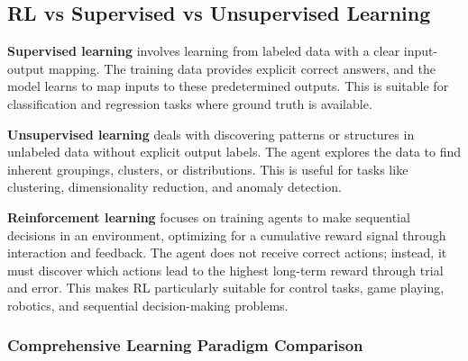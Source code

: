 \documentclass[11pt,a4paper]{article}
\begin{document}
\subsection{RL vs Supervised vs Unsupervised Learning}

\textbf{Supervised learning} involves learning from labeled data with a clear input-output mapping. The training data provides explicit correct answers, and the model learns to map inputs to these predetermined outputs. This is suitable for classification and regression tasks where ground truth is available.

\textbf{Unsupervised learning} deals with discovering patterns or structures in unlabeled data without explicit output labels. The agent explores the data to find inherent groupings, clusters, or distributions. This is useful for tasks like clustering, dimensionality reduction, and anomaly detection.

\textbf{Reinforcement learning} focuses on training agents to make sequential decisions in an environment, optimizing for a cumulative reward signal through interaction and feedback. The agent does not receive correct actions; instead, it must discover which actions lead to the highest long-term reward through trial and error. This makes RL particularly suitable for control tasks, game playing, robotics, and sequential decision-making problems.

\subsubsection{Comprehensive Learning Paradigm Comparison}
\end{document}

